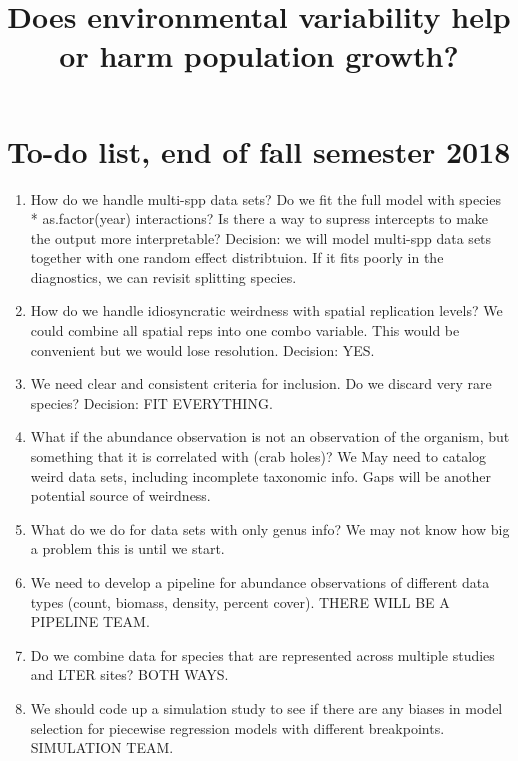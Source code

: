 \documentclass{article}
\title{Does environmental variability help or harm population growth?}
\begin{document}
  \maketitle

\section{To-do list, end of fall semester 2018}
\begin{enumerate}

\item{How do we handle multi-spp data sets? Do we fit the full model with species * as.factor(year) interactions? Is there a way to supress intercepts to make the output more interpretable? Decision: we will model multi-spp data sets together with one random effect distribtuion. If it fits poorly in the diagnostics, we can revisit splitting species.}

\item{How do we handle idiosyncratic weirdness with spatial replication levels? We could combine all spatial reps into one combo variable. This would be convenient but we would lose resolution. Decision: YES.}

\item{We need clear and consistent criteria for inclusion. Do we discard very rare species? Decision: FIT EVERYTHING. }

\item{What if the abundance observation is not an observation of the organism, but something that it is correlated with (crab holes)?  We May need to catalog weird data sets, including incomplete taxonomic info. Gaps will be another potential source of weirdness.}

\item{What do we do for data sets with only genus info? We may not know how big a problem this is until we start.}

\item{We need to develop a pipeline for abundance observations of different data types (count, biomass, density, percent cover). THERE WILL BE A PIPELINE TEAM.}

\item{Do we combine data for species that are represented across multiple studies and LTER sites? BOTH WAYS.}

\item{We should code up a simulation study to see if there are any biases in model selection for piecewise regression models with different breakpoints. SIMULATION TEAM.}


\end{enumerate}
\end{document}
